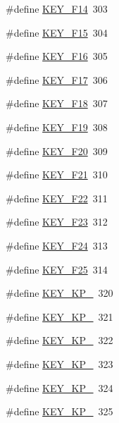 \begin{DoxyCompactItemize}
\item 
\#define \hyperlink{group___keys_gad566421e6cb409e725578835e9e328bb}{K\-E\-Y\-\_\-\-F14}~303
\item 
\#define \hyperlink{group___keys_ga4835f0dc20db5a4d3433acab66236595}{K\-E\-Y\-\_\-\-F15}~304
\item 
\#define \hyperlink{group___keys_gafea8064b70679bb9e0389d5f6621a2f2}{K\-E\-Y\-\_\-\-F16}~305
\item 
\#define \hyperlink{group___keys_ga6fa230f5d490af7d6ef87a88ca2db5ae}{K\-E\-Y\-\_\-\-F17}~306
\item 
\#define \hyperlink{group___keys_ga2f93cd984f0472309d8af80e1e2f947f}{K\-E\-Y\-\_\-\-F18}~307
\item 
\#define \hyperlink{group___keys_ga5bf91538e8323ad995199c817045b26e}{K\-E\-Y\-\_\-\-F19}~308
\item 
\#define \hyperlink{group___keys_ga49e680a4ea19e73fb97fe98b0891b0b5}{K\-E\-Y\-\_\-\-F20}~309
\item 
\#define \hyperlink{group___keys_ga0084ae075bfc60dc50f2a11c2fdf299f}{K\-E\-Y\-\_\-\-F21}~310
\item 
\#define \hyperlink{group___keys_gab481f83ccc2f1af97e32fcef5bf5c7f3}{K\-E\-Y\-\_\-\-F22}~311
\item 
\#define \hyperlink{group___keys_gaae4824ffb7a7f7e29443290c503e6718}{K\-E\-Y\-\_\-\-F23}~312
\item 
\#define \hyperlink{group___keys_gaa495d7fdfc50768240f0838fcebbd54b}{K\-E\-Y\-\_\-\-F24}~313
\item 
\#define \hyperlink{group___keys_gaaf3acce8d6b3c1c4b274acbeceab3f02}{K\-E\-Y\-\_\-\-F25}~314
\item 
\#define \hyperlink{group___keys_ga00d61046c59a7681792d12eb0242a6af}{K\-E\-Y\-\_\-\-K\-P\-\_}~320
\item 
\#define \hyperlink{group___keys_ga209f631838ed5150e1e4eb9572f2931a}{K\-E\-Y\-\_\-\-K\-P\-\_}~321
\item 
\#define \hyperlink{group___keys_gae3bbf1389c87103a8a153b901e739c5f}{K\-E\-Y\-\_\-\-K\-P\-\_}~322
\item 
\#define \hyperlink{group___keys_gaa8b82865739737e93e80ee52671964c8}{K\-E\-Y\-\_\-\-K\-P\-\_}~323
\item 
\#define \hyperlink{group___keys_gab5fb02cf27de2d325540492142224085}{K\-E\-Y\-\_\-\-K\-P\-\_}~324
\item 
\#define \hyperlink{group___keys_ga11b696881ff319badca7ffaace823f0e}{K\-E\-Y\-\_\-\-K\-P\-\_}~325
\item 

\end{DoxyCompactItemize}
